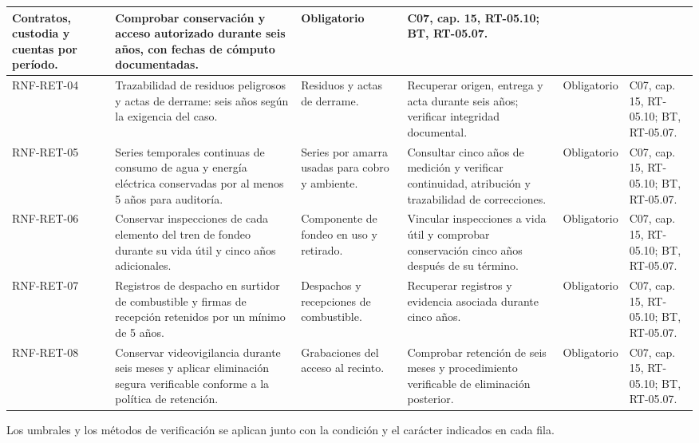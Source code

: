 \begin{longtable}{|L{0.096774\AnchoTablaAnexo}|L{0.298387\AnchoTablaAnexo}|L{0.133065\AnchoTablaAnexo}|L{0.233871\AnchoTablaAnexo}|L{0.076613\AnchoTablaAnexo}|L{0.161290\AnchoTablaAnexo}|}
Contratos, custodia y cuentas por período. &
Comprobar conservación y acceso autorizado durante seis años, con fechas de cómputo documentadas. &
Obligatorio &
C07, cap. 15, RT-05.10; BT, RT-05.07. \\ \hline
RNF-RET-04 &
Trazabilidad de residuos peligrosos y actas de derrame: seis años según la exigencia del caso. &
Residuos y actas de derrame. &
Recuperar origen, entrega y acta durante seis años; verificar integridad documental. &
Obligatorio &
C07, cap. 15, RT-05.10; BT, RT-05.07. \\ \hline
{}
RNF-RET-05 &
Series temporales continuas de consumo de agua y energía eléctrica conservadas por al menos 5 años para auditoría. &
Series por amarra usadas para cobro y ambiente. &
Consultar cinco años de medición y verificar continuidad, atribución y trazabilidad de correcciones. &
Obligatorio &
C07, cap. 15, RT-05.10; BT, RT-05.07. \\ \hline
RNF-RET-06 &
Conservar inspecciones de cada elemento del tren de fondeo durante su vida útil y cinco años adicionales. &
Componente de fondeo en uso y retirado. &
Vincular inspecciones a vida útil y comprobar conservación cinco años después de su término. &
Obligatorio &
C07, cap. 15, RT-05.10; BT, RT-05.07. \\ \hline
{}
RNF-RET-07 &
Registros de despacho en surtidor de combustible y firmas de recepción retenidos por un mínimo de 5 años. &
Despachos y recepciones de combustible. &
Recuperar registros y evidencia asociada durante cinco años. &
Obligatorio &
C07, cap. 15, RT-05.10; BT, RT-05.07. \\ \hline
RNF-RET-08 &
Conservar videovigilancia durante seis meses y aplicar eliminación segura verificable conforme a la política de retención. &
Grabaciones del acceso al recinto. &
Comprobar retención de seis meses y procedimiento verificable de eliminación posterior. &
Obligatorio &
C07, cap. 15, RT-05.10; BT, RT-05.07. \\ \hline
\end{longtable}

Los umbrales y los métodos de verificación se aplican junto con la condición y el carácter indicados en cada fila.

